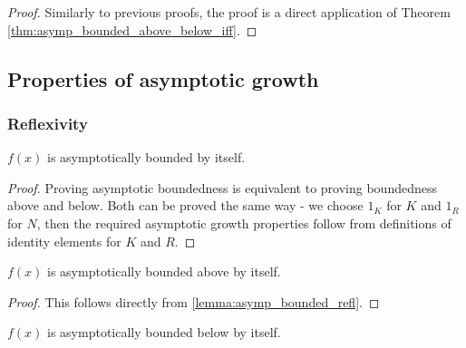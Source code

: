 \begin{proof}
    \leanok
    Similarly to previous proofs, the proof is a direct application of Theorem 
    \ref{thm:asymp_bounded_above_below_iff}.
\end{proof}


\subsection{Properties of asymptotic growth}

\subsubsection{Reflexivity}

\begin{lemma}
    \label{lemma:asymp_bounded_refl}
    \leanok
    $f(x)$ is asymptotically bounded by itself. 

\end{lemma}

\begin{proof}
    \leanok
    Proving asymptotic boundedness is equivalent to proving boundedness above and below.
    Both can be proved the same way - we choose $1_K$ for $K$ and $1_R$ for $N$, then the
    required asymptotic growth properties follow from definitions of identity elements for 
    $K$ and $R$.
\end{proof}

\begin{lemma}
    \label{lemma:asymp_bounded_above_refl}
    \leanok
    $f(x)$ is asymptotically bounded above by itself.

\end{lemma}

\begin{proof}
    \leanok
    This follows directly from \ref{lemma:asymp_bounded_refl}.
\end{proof}

\begin{lemma}
    \label{lemma:asymp_bounded_below_refl}
    \leanok
    $f(x)$ is asymptotically bounded below by itself.

\end{lemma}

